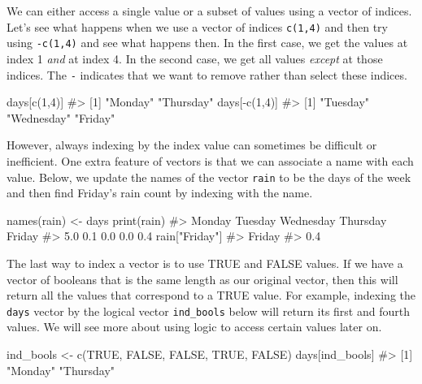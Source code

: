 \documentclass[
  letterpaper,
]{krantz}
\makeatletter
\newenvironment{Shaded}{\begin{snugshade}}{\end{snugshade}}
\newcommand{\CommentTok}[1]{\textcolor[rgb]{0.37,0.37,0.37}{#1}}
\newcommand{\ConstantTok}[1]{\textcolor[rgb]{0.56,0.35,0.01}{#1}}
\newcommand{\DecValTok}[1]{\textcolor[rgb]{0.68,0.00,0.00}{#1}}
\newcommand{\FunctionTok}[1]{\textcolor[rgb]{0.28,0.35,0.67}{#1}}
\newcommand{\NormalTok}[1]{\textcolor[rgb]{0.00,0.23,0.31}{#1}}
\newcommand{\OtherTok}[1]{\textcolor[rgb]{0.00,0.23,0.31}{#1}}
\newcommand{\SpecialCharTok}[1]{\textcolor[rgb]{0.37,0.37,0.37}{#1}}
\newcommand{\StringTok}[1]{\textcolor[rgb]{0.13,0.47,0.30}{#1}}
\newenvironment{kframe}{%
\medskip{}
\setlength{\fboxsep}{.8em}
 \def\at@end@of@kframe{}%
 \ifinner\ifhmode%
  \def\at@end@of@kframe{\end{minipage}}%
  \begin{minipage}{\columnwidth}%
 \fi\fi%
 \def\FrameCommand##1{\hskip\@totalleftmargin \hskip-\fboxsep
 \colorbox{shadecolor}{##1}\hskip-\fboxsep
     \hskip-\linewidth \hskip-\@totalleftmargin \hskip\columnwidth}%
 \MakeFramed {\advance\hsize-\width
   \@totalleftmargin\z@ \linewidth\hsize
   \@setminipage}}%
 {\par\unskip\endMakeFramed%
 \at@end@of@kframe}
\renewenvironment{Shaded}{\begin{kframe}}{\end{kframe}}
\makeatother
\begin{document}
We can either access a single value or a subset of values using a vector
of indices. Let's see what happens when we use a vector of indices
\texttt{c(1,4)} and then try using \texttt{-c(1,4)} and see what happens
then. In the first case, we get the values at index 1 \emph{and} at
index 4. In the second case, we get all values \emph{except} at those
indices. The \texttt{-} indicates that we want to remove rather than
select these indices.

\begin{Shaded}
\begin{Highlighting}[]
\NormalTok{days[}\FunctionTok{c}\NormalTok{(}\DecValTok{1}\NormalTok{,}\DecValTok{4}\NormalTok{)]}
\CommentTok{\#\textgreater{} [1] "Monday"   "Thursday"}
\NormalTok{days[}\SpecialCharTok{{-}}\FunctionTok{c}\NormalTok{(}\DecValTok{1}\NormalTok{,}\DecValTok{4}\NormalTok{)]}
\CommentTok{\#\textgreater{} [1] "Tuesday"   "Wednesday" "Friday"}
\end{Highlighting}
\end{Shaded}

However, always indexing by the index value can sometimes be difficult
or inefficient. One extra feature of vectors is that we can associate a
name with each value. Below, we update the names of the vector
\texttt{rain} to be the days of the week and then find Friday's rain
count by indexing with the name.

\begin{Shaded}
\begin{Highlighting}[]
\FunctionTok{names}\NormalTok{(rain) }\OtherTok{\textless{}{-}}\NormalTok{ days}
\FunctionTok{print}\NormalTok{(rain)}
\CommentTok{\#\textgreater{}    Monday   Tuesday Wednesday  Thursday    Friday }
\CommentTok{\#\textgreater{}       5.0       0.1       0.0       0.0       0.4}
\NormalTok{rain[}\StringTok{"Friday"}\NormalTok{]}
\CommentTok{\#\textgreater{} Friday }
\CommentTok{\#\textgreater{}    0.4}
\end{Highlighting}
\end{Shaded}

The last way to index a vector is to use TRUE and FALSE values. If we
have a vector of booleans that is the same length as our original
vector, then this will return all the values that correspond to a TRUE
value. For example, indexing the \texttt{days} vector by the logical
vector \texttt{ind\_bools} below will return its first and fourth
values. We will see more about using logic to access certain values
later on.

\begin{Shaded}
\begin{Highlighting}[]
\NormalTok{ind\_bools }\OtherTok{\textless{}{-}} \FunctionTok{c}\NormalTok{(}\ConstantTok{TRUE}\NormalTok{, }\ConstantTok{FALSE}\NormalTok{, }\ConstantTok{FALSE}\NormalTok{, }\ConstantTok{TRUE}\NormalTok{, }\ConstantTok{FALSE}\NormalTok{)}
\NormalTok{days[ind\_bools]}
\CommentTok{\#\textgreater{} [1] "Monday"   "Thursday"}
\end{Highlighting}
\end{Shaded}
\end{document}
